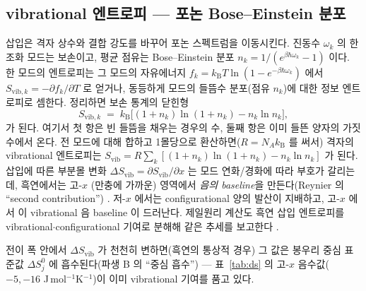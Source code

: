 \documentclass[11pt,a4paper]{article}
\newcommand{\vib}{\mathrm{vib}}
\newcommand{\kB}{k_{\mathrm B}}
\begin{document}
\subsection{vibrational 엔트로피 — 포논 Bose--Einstein 분포}
삽입은 격자 상수와 결합 강도를 바꾸어 포논 스펙트럼을 이동시킨다. 진동수 $\omega_k$ 의 한 조화 모드는 보손이고,
평균 점유는 Bose--Einstein 분포 $n_k=1/(e^{\beta\hbar\omega_k}-1)$ 이다. 한 모드의 엔트로피는 그 모드의 자유에너지
$f_k=\kB T\ln(1-e^{-\beta\hbar\omega_k})$ 에서 $S_{\vib,k}=-\partial f_k/\partial T$ 로 얻거나, 동등하게 모드의 들뜸수
분포(점유 $n_k$)에 대한 정보 엔트로피로 셈한다. 정리하면 보손 통계의 닫힌형
\begin{equation}
S_{\vib,k} \;=\; \kB\bigl[(1+n_k)\ln(1+n_k) - n_k\ln n_k\bigr],
\label{eq:Svib_mode}
\end{equation}
가 된다. 여기서 첫 항은 빈 들뜸을 채우는 경우의 수, 둘째 항은 이미 들뜬 양자의 가짓수에서 온다. 전 모드에 대해
합하고 1몰당으로 환산하면($R=N_A\kB$ 를 써서) 격자의 vibrational 엔트로피는
$S_\vib=R\sum_k[(1+n_k)\ln(1+n_k)-n_k\ln n_k]$ 가 된다. 삽입에 따른 부분몰
변화 $\Delta S_\vib=\partial S_\vib/\partial x$ 는 모드 연화/경화에 따라 부호가 갈리는데, 흑연에서는 고-$x$
(만충에 가까운) 영역에서 \emph{음의 baseline}을 만든다(Reynier 의 ``second contribution'') \cite{reynier2003}.
저-$x$ 에서는 configurational 양의 발산이 지배하고, 고-$x$ 에서 이 vibrational 음 baseline 이 드러난다. 제일원리
계산도 흑연 삽입 엔트로피를 vibrational$\cdot$configurational 기여로 분해해 같은 추세를 보고한다 \cite{jpcc2021}.

전이 폭 안에서 $\Delta S_\vib$ 가 천천히 변하면(흑연의 통상적 경우) 그 값은 봉우리 중심 표준값
$\Delta S^0_j$ 에 흡수된다(파생 B 의 ``중심 흡수'') — 표~\ref{tab:ds} 의 고-$x$ 음수값($-5,-16$
J\,mol$^{-1}$K$^{-1}$)이 이미 vibrational 기여를 품고 있다.
\end{document}
